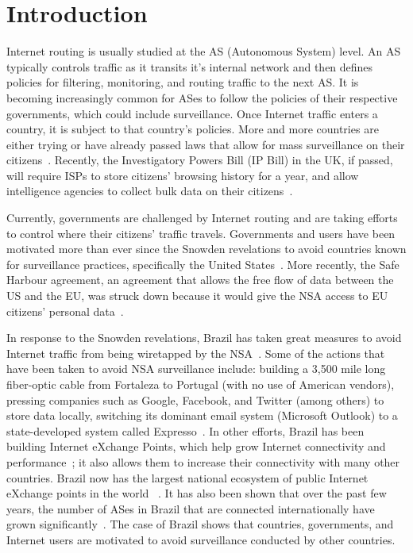 \section{Introduction}
\label{intro}

Internet routing is usually studied at the AS (Autonomous System) level.  An AS typically controls traffic as it transits it's internal network and then defines policies for filtering, monitoring, and routing traffic to the next AS.  It is becoming increasingly common for ASes to follow the policies of their respective governments, which could include surveillance.  Once Internet traffic enters a country, it is subject to that country's policies.  More and more countries are either trying or have already passed laws that allow for mass surveillance on their citizens~\cite{france_surveillance, netherlands_surveillance, kazak_surveillance}.  Recently, the Investigatory Powers Bill (IP Bill) in the UK, if passed, will require ISPs to store citizens' browsing history for a year, and allow intelligence agencies to collect bulk data on their citizens~\cite{uk_bill}.

Currently, governments are challenged by Internet routing and are taking efforts to control where their citizens' traffic travels.  Governments and users have been motivated more than ever since the Snowden revelations to avoid countries known for surveillance practices, specifically the United States~\cite{russia_secure_internet, routing_errors, dte}.  More recently, the Safe Harbour agreement, an agreement that allows the free flow of data between the US and the EU, was struck down because it would give the NSA access to EU citizens' personal data~\cite{safe_harbour_illegal, safe_harbour_undecided}.

In response to the Snowden revelations, Brazil has taken great measures to avoid Internet traffic from being wiretapped by the NSA~\cite{brazil_history, brazil_break_from_US, brazil_conference, brazil_conference2, brazil_human_rights}.  Some of the actions that have been taken to avoid NSA surveillance include: building a 3,500 mile long fiber-optic cable from Fortaleza to Portugal (with no use of American vendors), pressing companies such as Google, Facebook, and Twitter (among others) to store data locally, switching its dominant email system (Microsoft Outlook) to a state-developed system called Expresso~\cite{brazil_cable, brazil_us_companies}.  In other efforts, Brazil has been building Internet eXchange Points, which help grow Internet connectivity and performance~\cite{brazil_IXP1, brazil_IXP2}; it also allows them to increase their connectivity with many other countries.  Brazil now has the largest national ecosystem of public Internet eXchange points in the world ~\cite{brazil_largest_IXP}.  It has also been shown that over the past few years, the number of ASes in Brazil that are connected internationally have grown significantly~\cite{brazil_international_ases}.  The case of Brazil shows that countries, governments, and Internet users are motivated to avoid surveillance conducted by other countries.

